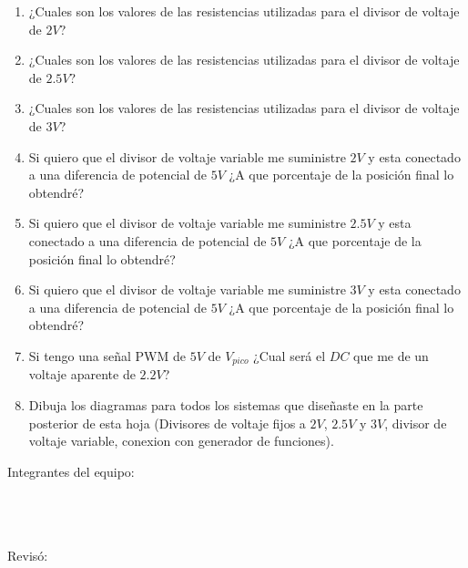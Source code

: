 	\begin{enumerate}
		\item ¿Cuales son los valores de las resistencias utilizadas para el divisor de voltaje de $2 V$? \newline
		\item ¿Cuales son los valores de las resistencias utilizadas para el divisor de voltaje de $2.5 V$? \newline
		\item ¿Cuales son los valores de las resistencias utilizadas para el divisor de voltaje de $3 V$? \newline
		\item Si quiero que el divisor de voltaje variable me suministre $2 V$ y esta conectado a una diferencia de potencial de $5 V$ ¿A que porcentaje de la posición final lo obtendré? \newline
		\item Si quiero que el divisor de voltaje variable me suministre $2.5 V$ y esta conectado a una diferencia de potencial de $5 V$ ¿A que porcentaje de la posición final lo obtendré? \newline
		\item Si quiero que el divisor de voltaje variable me suministre $3 V$ y esta conectado a una diferencia de potencial de $5 V$ ¿A que porcentaje de la posición final lo obtendré? \newline
		\item Si tengo una señal PWM de $5 V$ de $V_{pico}$ ¿Cual será el $DC$ que me de un voltaje aparente de $2.2 V$?\newline
		\item Dibuja los diagramas para todos los sistemas que diseñaste en la parte posterior de esta hoja (Divisores de voltaje fijos a $2 V$, $2.5 V$ y $3 V$, divisor de voltaje variable, conexion con generador de funciones). \newline \newline \newline \newline \newline
	\end{enumerate}

	Integrantes del equipo: \\[0.2cm]
	\horrule{0.5pt} \\[0.2cm] %
	\horrule{0.5pt} \\[0.2cm] %
	\horrule{0.5pt} \\[0.2cm] %
	\horrule{0.5pt} %

	Revisó: \\[0.2cm]
	\horrule{0.5pt} \\%



